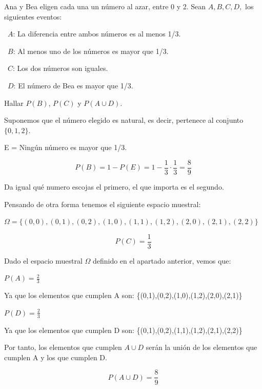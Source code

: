 \begin{problem}[5] Ana y Bea eligen cada una un n\'umero al azar, entre 0 y 2. Sean $A, B, C, D,$ los siguientes
eventos: 

\  $A$: La diferencia entre ambos n\'umeros es al menos 1/3.

\ $B$:   Al menos uno de los n\'umeros es mayor que 1/3.

\ $C$: Los dos n\'umeros son iguales.

\ $D$: El n\'umero de Bea es mayor que 1/3.

Hallar $P(B)$, $P(C)$ y $P(A\cup D)$.
\solution

\begin{expla}
Suponemos que el número elegido es natural, es decir, pertenece al conjunto $\{0,1,2\}$.
\end{expla}

\spart
E = Ningún número es mayor que 1/3.

\[
P(B)=1 - P(E)= 1 - \frac{1}{3}\cdot\frac{1}{3} = \frac{8}{9}
\]

\spart

Da igual qué numero escojas el primero, el que importa es el segundo.

Pensando de otra forma tenemos el siguiente espacio muestral:

$\Omega=\{(0,0),(0,1),(0,2),(1,0),(1,1),(1,2),(2,0),(2,1),(2,2)\}$

\[
P(C)=\frac{1}{3}
\]

\spart
Dado el espacio muestral $\Omega$ definido en el apartado anterior, vemos que:

$P(A)=\frac{2}{3}$ 

Ya que los elementos que cumplen A son: \{(0,1),(0,2),(1,0),(1,2),(2,0),(2,1)\}

$P(D)=\frac{2}{3}$

Ya que los elementos que cumplen D son: \{(0,1),(0,2),(1,1),(1,2),(2,1),(2,2)\}

Por tanto, los elementos que cumplen $A\cup D$ serán la unión de los elementos que cumplen A y los que cumplen D.

\[
P(A \cup D) = \frac{8}{9}
\]

\end{problem}


